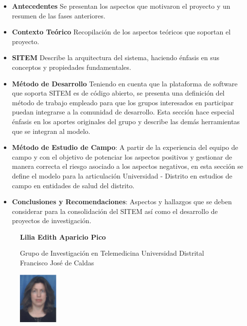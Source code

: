 \begin{itemize}
 \item \textbf{Antecedentes} Se presentan los aspectos que motivaron el proyecto y un resumen de las fases anteriores.
 \item \textbf{Contexto Teórico} Recopilación de los aspectos teóricos que soportan el proyecto. 
 \item \textbf{SITEM} Describe la arquitectura del sistema, haciendo énfasis en sus conceptos y propiedades fundamentales.
 \item \textbf{Método de Desarrollo} Teniendo en cuenta que la plataforma de software que soporta SITEM es de código abierto, se presenta una definición del método de trabajo empleado para que los grupos interesados en participar puedan integrarse a la comunidad de desarrollo. Esta sección hace especial énfasis en los aportes originales del grupo y describe las demás herramientas que se integran al modelo.
 \item \textbf{Método de Estudio de Campo}: A partir de la experiencia del equipo de campo y con el objetivo de potenciar los aspectos positivos y gestionar de manera correcta el riesgo asociado a los aspectos negativos, en esta sección se define el modelo para la articulación Universidad - Distrito en estudios de campo en entidades de salud del distrito.
 \item \textbf{Conclusiones y Recomendaciones}: Aspectos y hallazgos que se deben considerar para la consolidación del SITEM así como el desarrollo de proyectos de investigación.
\end{itemize}

\begin{figure}[!htpb]
\begin{minipage}[r]{0.8\textwidth}
\begin{flushright}
\textbf{Lilia Edith Aparicio Pico}

Grupo de Investigación en Telemedicina
Universidad Distrital Francisco José de Caldas
\end{flushright}
\end{minipage}
\begin{minipage}[r]{0.15\textwidth}
 \includegraphics[width=20mm, height=26mm]{edith.png}
\end{minipage}
\end{figure}